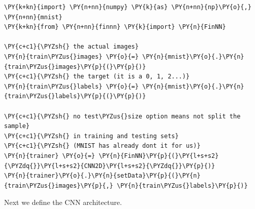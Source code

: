 \begin{tcolorbox}[breakable, size=fbox, boxrule=1pt, pad at break*=1mm,colback=cellbackground, colframe=cellborder]
\begin{Verbatim}[commandchars=\\\{\}]
\PY{k+kn}{import} \PY{n+nn}{numpy} \PY{k}{as} \PY{n+nn}{np}\PY{o}{,} \PY{n+nn}{mnist}
\PY{k+kn}{from} \PY{n+nn}{finnn} \PY{k}{import} \PY{n}{FinNN}
	
\PY{c+c1}{\PYZsh{} the actual images}
\PY{n}{train\PYZus{}images} \PY{o}{=} \PY{n}{mnist}\PY{o}{.}\PY{n}{train\PYZus{}images}\PY{p}{(}\PY{p}{)} 
\PY{c+c1}{\PYZsh{} the target (it is a 0, 1, 2...)}
\PY{n}{train\PYZus{}labels} \PY{o}{=} \PY{n}{mnist}\PY{o}{.}\PY{n}{train\PYZus{}labels}\PY{p}{(}\PY{p}{)} 
	
\PY{c+c1}{\PYZsh{} no test\PYZus{}size option means not split the sample}
\PY{c+c1}{\PYZsh{} in training and testing sets}
\PY{c+c1}{\PYZsh{} (MNIST has already dont it for us)}
\PY{n}{trainer} \PY{o}{=} \PY{n}{FinNN}\PY{p}{(}\PY{l+s+s2}{\PYZdq{}}\PY{l+s+s2}{CNN2D}\PY{l+s+s2}{\PYZdq{}}\PY{p}{)}
\PY{n}{trainer}\PY{o}{.}\PY{n}{setData}\PY{p}{(}\PY{n}{train\PYZus{}images}\PY{p}{,} \PY{n}{train\PYZus{}labels}\PY{p}{)}
\end{Verbatim}
\end{tcolorbox}

Next we define the CNN architecture.

